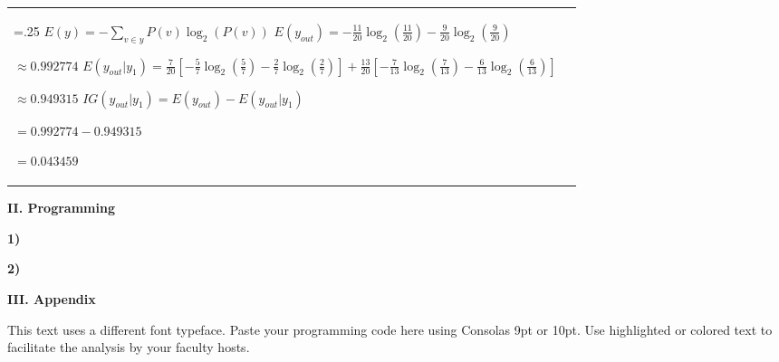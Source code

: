 \documentclass[11pt,a4paper]{article}
\begin{document}
\begin{flushleft}
\begin{tabularx}{1.09\textwidth}{>{\hsize=.25\hsize}X X}
  \normalsize\vspace{10mm}
  $ E(y) = -\sum_{v \in y} P(v)\log_2(P(v)) $
  \newline\newline
  $ E(y_{out}) = -\frac{11}{20}\log_2(\frac{11}{20}) -\frac{9}{20}\log_2(\frac{9}{20}) $ \par\vspace{1mm}
  \hspace{12.25mm} $ \approx 0.992774 $
  \newline\newline
  $ E(y_{out}|y_1) = \frac{7}{20}[-\frac{5}{7}\log_2(\frac{5}{7}) -\frac{2}{7}\log_2(\frac{2}{7})] + \frac{13}{20}[-\frac{7}{13}\log_2(\frac{7}{13}) -\frac{6}{13}\log_2(\frac{6}{13})] $ \par\vspace{1mm}
  \hspace{16.75mm} $ \approx 0.949315 $ 
  \newline\newline
  $ IG(y_{out}|y_1) = E(y_{out}) - E(y_{out}|y_1) $ \par\vspace{1mm}
  \hspace{18.75mm} $ = 0.992774 - 0.949315 $ \par\vspace{1mm}
  \hspace{18.75mm} $ = 0.043459 $
  
\end{tabularx}
\end{flushleft}

\begin{center}
\textbf{II. Programming}
\end{center}

\begin{flushleft}
\textbf{1)}
\end{flushleft}
  
\begin{flushleft}
\textbf{2)}
\end{flushleft}

\begin{center}
\textbf{III. Appendix}
\end{center}

{\selectfont
This text uses a different font typeface.
Paste your programming code here using Consolas 9pt or 10pt.
Use highlighted or colored text to facilitate the analysis by your faculty hosts.
}
\end{document}
